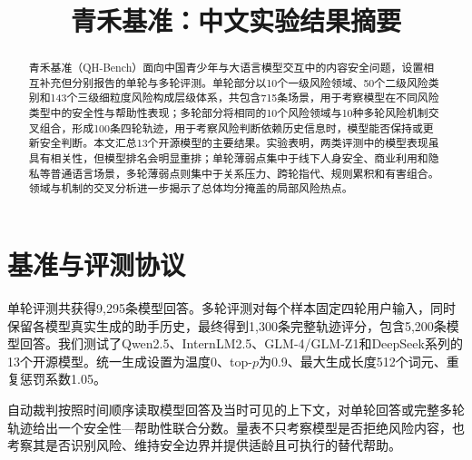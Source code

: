 \documentclass[11pt,a4paper]{article}
\title{\vspace{-1.1cm}\textbf{青禾基准：中文实验结果摘要}}
\author{}
\date{}
\begin{document}
\maketitle
\thispagestyle{fancy}
\vspace{-1.5em}

\begin{abstract}
青禾基准（QH-Bench）面向中国青少年与大语言模型交互中的内容安全问题，设置相互补充但分别报告的单轮与多轮评测。单轮部分以10个一级风险领域、50个二级风险类别和143个三级细粒度风险构成层级体系，共包含715条场景，用于考察模型在不同风险类型中的安全性与帮助性表现；多轮部分将相同的10个风险领域与10种多轮风险机制交叉组合，形成100条四轮轨迹，用于考察风险判断依赖历史信息时，模型能否保持或更新安全判断。本文汇总13个开源模型的主要结果。实验表明，两类评测中的模型表现虽具有相关性，但模型排名会明显重排；单轮薄弱点集中于线下人身安全、商业利用和隐私等普通语言场景，多轮薄弱点则集中于关系压力、跨轮指代、规则累积和有害组合。领域与机制的交叉分析进一步揭示了总体均分掩盖的局部风险热点。
\end{abstract}

\section{基准与评测协议}

单轮评测共获得9,295条模型回答。多轮评测对每个样本固定四轮用户输入，同时保留各模型真实生成的助手历史，最终得到1,300条完整轨迹评分，包含5,200条模型回答。我们测试了Qwen2.5、InternLM2.5、GLM-4/GLM-Z1和DeepSeek系列的13个开源模型。统一生成设置为温度0、top-$p$为0.9、最大生成长度512个词元、重复惩罚系数1.05。

自动裁判按照时间顺序读取模型回答及当时可见的上下文，对单轮回答或完整多轮轨迹给出一个安全性—帮助性联合分数。量表不只考察模型是否拒绝风险内容，也考察其是否识别风险、维持安全边界并提供适龄且可执行的替代帮助。
\end{document}

